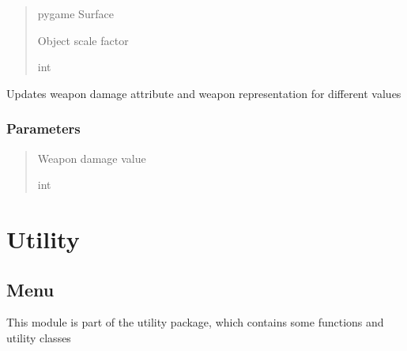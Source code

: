\documentclass[letterpaper,10pt,english]{sphinxmanual}
\begin{document}
\begin{fulllineitems}
\begin{fulllineitems}
\begin{quote}
\begin{description}
\sphinxAtStartPar
pygame Surface

\sphinxAtStartPar
Object scale factor

\sphinxAtStartPar
int

\end{description}\end{quote}

\end{fulllineitems}


\begin{fulllineitems}
\label{\detokenize{api_reference/dungeon_gui/Weapon:Weapon.Weapon.update_damage}}
\pysigstartsignatures
{}
\pysigstopsignatures
\sphinxAtStartPar
Updates weapon damage attribute and weapon representation for different values


\subsubsection{Parameters}
\label{\detokenize{api_reference/dungeon_gui/Weapon:id1}}\begin{quote}\begin{description}
\sphinxAtStartPar
Weapon damage value

\sphinxAtStartPar
int

\end{description}\end{quote}

\end{fulllineitems}


\end{fulllineitems}


\sphinxstepscope


\section{Utility}
\label{\detokenize{api_reference/utility:utility}}\label{\detokenize{api_reference/utility::doc}}
\sphinxstepscope


\subsection{Menu}
\label{\detokenize{api_reference/utility/menu:module-menu}}\label{\detokenize{api_reference/utility/menu:menu}}\label{\detokenize{api_reference/utility/menu::doc}}
\sphinxAtStartPar
This module is part of the utility package, which contains some functions and utility classes
\end{document}
